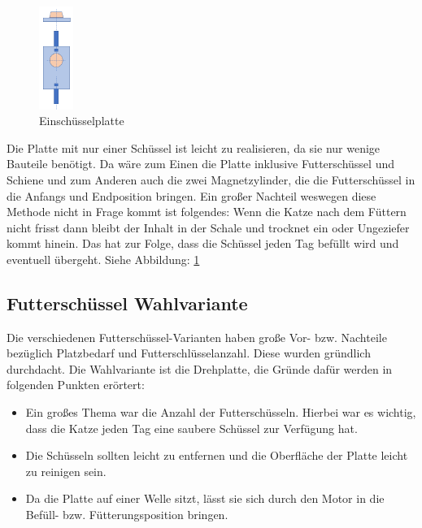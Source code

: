 \begin{figure}
\vspace{-20pt}
  \begin{center}
    \includegraphics[width=0.10\textwidth]{Bilder/Powerpoint/Einschuessel_platte}
  \end{center}
  \caption{Einschüsselplatte}
  \label{Schüssel Eins}
  \vspace{-10pt}
\end{figure}

Die Platte mit nur einer Schüssel ist leicht zu realisieren, da sie nur wenige Bauteile benötigt. Da wäre zum Einen die Platte inklusive Futterschüssel und Schiene und zum Anderen auch die zwei Magnetzylinder, die die Futterschüssel in die Anfangs und Endposition bringen. Ein großer Nachteil weswegen diese Methode nicht in Frage kommt ist folgendes: Wenn die Katze nach dem Füttern nicht frisst dann bleibt der Inhalt in der Schale und trocknet ein oder Ungeziefer kommt hinein. Das hat zur Folge, dass die Schüssel jeden Tag befüllt wird und eventuell übergeht. Siehe Abbildung: \ref{Schüssel Eins} 

\subsection{Futterschüssel Wahlvariante}

Die verschiedenen Futterschüssel-Varianten haben große Vor- bzw. Nachteile bezüglich Platzbedarf und Futterschlüsselanzahl. Diese wurden gründlich durchdacht. Die Wahlvariante ist die Drehplatte, die Gründe dafür werden in folgenden Punkten erörtert: 

\begin{itemize}
\item Ein großes Thema war die Anzahl der Futterschüsseln. Hierbei war es wichtig, dass die Katze jeden Tag eine saubere Schüssel zur Verfügung hat.
\item Die Schüsseln sollten leicht zu entfernen und die Oberfläche der Platte leicht zu reinigen sein.
\item Da die Platte auf einer Welle sitzt, lässt sie sich durch den Motor in die Befüll- bzw. Fütterungsposition bringen.
\end{itemize} 

